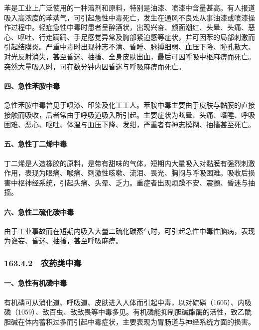 苯是工业上广泛使用的一种溶剂和原料，特别是油漆、喷漆中含量甚高。有人报道吸入高浓度的苯蒸气，可引起急性中毒死亡，发生在通风不良处从事油漆或喷漆操作过程中。轻症急性中毒时患者呈醉酒状，出现兴奋、颜面潮红、头晕、头痛、恶心、呕吐、行走蹒跚、手足感觉异常及胸部紧迫感等症状，并可因苯的局部刺激而引起结膜炎。严重中毒时出现神志不清、昏睡、脉搏细弱、血压下降、瞳孔散大、对光反射消失，甚至昏迷、抽搐、全身皮肤出血，最后可因呼吸中枢麻痹而死亡。突然大量吸入时，可在数分钟内因昏迷与呼吸麻痹而死亡。

\paragraph{四、急性苯胺中毒}

急性苯胺中毒曾见于喷漆、印染及化工工人。苯胺中毒主要由于皮肤与黏膜的直接接触而吸收，后者常由于呼吸道吸入所引起。主要症状为眩晕、头痛、嗜睡、呼吸困难、恶心、呕吐、体温与血压下降、发绀，严重者有神志模糊、抽搐甚至死亡。

\paragraph{五、急性丁二烯中毒}

丁二烯是人造橡胶的原料，是带有甜味的气体，短期内大量吸入对黏膜有强烈刺激作用，表现为眼痛、喉痛、刺激性咳嗽、流泪、畏光、胸闷与呼吸困难。吸收后损害中枢神经系统，引起头痛、头晕、乏力。重症者出现烦躁不安、震颤、昏迷与抽搐。

\paragraph{六、急性二硫化碳中毒}

由于工业事故而在短期内吸入大量二硫化碳蒸气时，可引起急性中毒性脑病，表现为谵妄、昏迷、抽搐，甚至呼吸麻痹。

\subsubsection{163.4.2　农药类中毒}

\paragraph{一、急性有机磷中毒}

有机磷可从消化道、呼吸道、皮肤进入人体而引起中毒，以对硫磷（1605）、内吸磷（1059）、敌百虫、敌敌畏等中毒多见。有机磷能抑制胆碱酯酶的活性，致乙酰胆碱在体内蓄积过多而引起中毒症状，主要表现为胃肠道与神经系统方面的损害。

